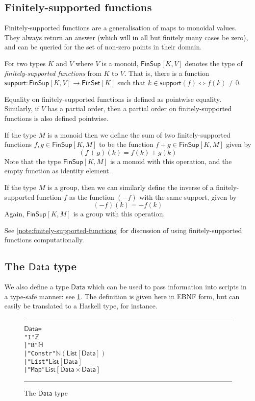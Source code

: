 \documentclass[a4paper]{article}
\newcounter{note}
\newcommand{\s}{\textsf}  %
\newcommand{\msf}[1]{\ensuremath{\mathsf{#1}}}
\newcommand\rfskip{7pt}
\newenvironment{ruledfigure}[1]{\begin{figure}[#1]\hrule\vspace{\rfskip}}{\vspace{\rfskip}\hrule\end{figure}}
\newcommand{\List}[1]{\ensuremath{\s{List}[#1]}}
\newcommand{\FinSet}[1]{\ensuremath{\s{FinSet}[#1]}}
\newcommand{\FinSup}[2]{\ensuremath{\s{FinSup}[#1,#2]}}
\newcommand{\support}{\msf{support}}
\newcommand{\Data}{\ensuremath{\s{Data}}}
\newcommand\N{\ensuremath{\mathbb{N}}}
\newcommand\Z{\ensuremath{\mathbb{Z}}}
\renewcommand\H{\ensuremath{\mathbb{H}}}
\begin{document}
\subsection {Finitely-supported functions}
\label{sec:fsfs}

Finitely-supported functions are a generalisation of maps to monoidal values.
They always return an answer (which will in all but finitely many cases be
zero), and can be queried for the set of non-zero points in their domain.

For two types $K$ and $V$ where $V$ is a monoid, $\FinSup{K}{V}$ denotes the type of
\textit{finitely-supported functions} from $K$ to $V$. That is, there is a
function $\support : \FinSup{K}{V} \rightarrow \FinSet{K}$ such that
$k \in \support(f) \Leftrightarrow f(k) \neq 0$.

Equality on finitely-supported functions is defined as pointwise equality. Similarly,
if $V$ has a partial order, then a partial order on finitely-supported functions
is also defined pointwise.

If the type $M$ is a monoid then we define the sum of two finitely-supported
functions
$f, g \in \FinSup{K}{M}$ to be the function $f+g \in \FinSup{K}{M}$ given by
\[(f+g)(k) = f(k) + g(k) \]
Note that the type $\FinSup{K}{M}$ is a monoid with this
operation, and the empty function as
identity element.

If the type $M$ is a group, then we can
similarly define the inverse of a finitely-supported function $f$ as
the function $(-f)$ with the same support, given by
\[ (-f)(k) = -f(k) \]
Again, $\FinSup{K}{M}$ is a group with this operation.

See \cref{note:finitely-supported-functions} for discussion of using
finitely-supported functions computationally.

\subsection{The \Data{} type}
We also define a type \Data{} which can be used to pass information
into scripts in a type-safe manner: see \cref{fig:data-defn}. The
definition is given here in EBNF form, but can easily be translated to
a Haskell type, for instance.

\begin{ruledfigure}{H}
\begin{alltt}
  \Data =
      "I" \(\Z\)
    | "B" \(\H\)
    | "Constr" \(\N (\List{\Data})\)
    | "List" \(\List{\Data}\)
    | "Map" \(\List{\Data\times\Data}\)
\end{alltt}
\caption{The \Data{} type}
\label{fig:data-defn}
\end{ruledfigure}
\end{document}

